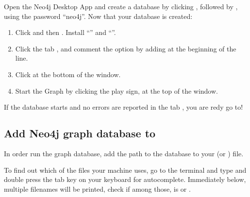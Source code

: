 \documentclass[letterpaper,10pt,english]{sphinxmanual}
\begin{document}
\noindent{}

\noindent{}

\noindent{}

Open the Neo4j Desktop App and create a database by clicking , followed by , using the password “neo4j”.
Now that your database is created:

\noindent{}

\noindent{}

\noindent{}
\begin{enumerate}
%
\item {} 
Click  and then . Install “” and “”.

\item {} 
Click the tab , and comment the option  by adding \sphinxcode{\sphinxupquote{\#}} at the beginning of the line.

\item {} 
Click  at the bottom of the window.

\item {} 
Start the Graph by clicking the play sign, at the top of the window.

\end{enumerate}

If the database starts and no errors are reported in the tab , you are redy go to!


\subsection{Add Neo4j graph database to }
\label{\detokenize{intro/getting-started-with-neo4j:add-neo4j-graph-database-to-bashrc}}
In order run the graph database, add the path to the database to your  (or ) file.

To find out which of the files your machine uses, go to the terminal and type  and double press the tab key on your keyboard for auto\sphinxhyphen{}complete.
Immediately below, multiple filenames will be printed, check if among those, is  or .
\end{document}
